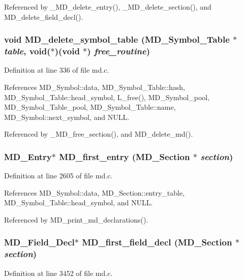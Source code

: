 Referenced by \_\-MD\_\-delete\_\-entry(), \_\-MD\_\-delete\_\-section(), and MD\_\-delete\_\-field\_\-decl().
\subsubsection{\setlength{\rightskip}{0pt plus 5cm}void MD\_\-delete\_\-symbol\_\-table (\bf{MD\_\-Symbol\_\-Table} $\ast$ {\em table}, void($\ast$)(void $\ast$) {\em free\_\-routine})}\label{md_8c_5112c261122724f6a951c90efdc2dabf}




Definition at line 336 of file md.c.

References MD\_\-Symbol::data, MD\_\-Symbol\_\-Table::hash, MD\_\-Symbol\_\-Table::head\_\-symbol, L\_\-free(), MD\_\-Symbol\_\-pool, MD\_\-Symbol\_\-Table\_\-pool, MD\_\-Symbol\_\-Table::name, MD\_\-Symbol::next\_\-symbol, and NULL.

Referenced by \_\-MD\_\-free\_\-section(), and MD\_\-delete\_\-md().
\subsubsection{\setlength{\rightskip}{0pt plus 5cm}\bf{MD\_\-Entry}$\ast$ MD\_\-first\_\-entry (\bf{MD\_\-Section} $\ast$ {\em section})}\label{md_8c_665a6d3a42e627dd69abb473cdc4aade}




Definition at line 2605 of file md.c.

References MD\_\-Symbol::data, MD\_\-Section::entry\_\-table, MD\_\-Symbol\_\-Table::head\_\-symbol, and NULL.

Referenced by MD\_\-print\_\-md\_\-declarations().
\subsubsection{\setlength{\rightskip}{0pt plus 5cm}\bf{MD\_\-Field\_\-Decl}$\ast$ MD\_\-first\_\-field\_\-decl (\bf{MD\_\-Section} $\ast$ {\em section})}\label{md_8c_ec8db6e1a71d3ca153e81e270872e8a4}




Definition at line 3452 of file md.c.

